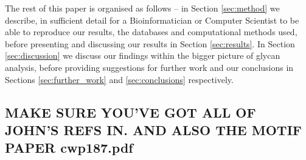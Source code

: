 \documentclass[12pt,a4paper]{article}
\begin{document}
The rest of this paper is organised as follows -- in Section \ref{sec:method} we describe, in sufficient detail for a Bioinformatician or Computer Scientist to be able to reproduce our results, the databases and computational methods used, before presenting and discussing our results in Section \ref{sec:results}. In Section \ref{sec:discussion} we discuss our findings within the bigger picture of glycan analysis, before providing suggestions for further work and our conclusions in Sections \ref{sec:further_work} and \ref{sec:conclusions} respectively.


\subsection{MAKE SURE YOU'VE GOT ALL OF JOHN'S REFS IN. AND ALSO THE MOTIF PAPER cwp187.pdf}









\end{document}
